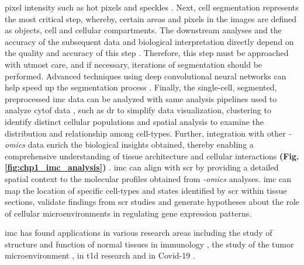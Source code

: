 pixel intensity such as hot pixels and speckles \textbf{\cite{milosevic_different_2023}}. Next, cell segmentation represents the most critical step, whereby, certain areas and pixels in the images are defined as objects, cell and cellular compartments. The downstream analyses and the accuracy of the subsequent data and biological interpretation directly depend on the quality and accuracy of this step \textbf{\cite{milosevic_different_2023}}. Therefore, this step must be approached with utmost care, and if necessary, iterations of segmentation should be performed. Advanced techniques using deep convolutional neural networks can help speed up the segmentation process \textbf{\cite{jung_automatic_2019,fujita_cell_2021}}. %
Finally, the single-cell, segmented, preprocessed \gls{imc} data can be analyzed with same analysis pipelines used to analyze \gls{cytof} data \textbf{\cite{veenstra_research_2021}}, such as \gls{dr} to simplify data visualization, clustering to identify distinct cellular populations and spatial analysis to examine the distribution and relationship among cell-types. Further, integration with other \textit{-omics} data enrich the biological insights obtained, thereby enabling a comprehensive understanding of tissue architecture and cellular interactions \textbf{(Fig. \ref{fig:chp1_imc_analysis})} \textbf{\cite{veenstra_research_2021}}. \gls{imc} can align with \gls{scr} by providing a detailed spatial context to the molecular profiles obtained from \textit{-omics} analyses. \gls{imc} can map the location of specific cell-types and states identified by \gls{scr} within tissue sections, validate findings from \gls{scr} studies and generate hypotheses about the role of cellular microenvironments in regulating gene expression patterns.\\

\par \gls{imc} has found applications in various research areas including the study of structure and function of normal tissues \textbf{\cite{chang_imaging_2017}} in immunology \textbf{\cite{zhao_spatiotemporal_2018,li_memory_2019}}, the study of the tumor microenvironment \textbf{\cite{jackson_single-cell_2020,moldoveanu_spatially_2022}}, in \gls{t1d} research \textbf{\cite{damond_map_2019,wang_multiplexed_2019}} and in Covid-19 \textbf{\cite{wang_imaging_2020}}. 


